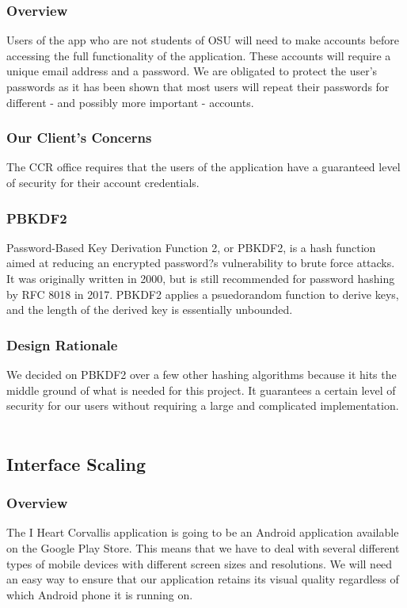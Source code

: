 \documentclass[draftclsnofoot, onecolumn, 10pt, compsoc]{IEEEtran}
\begin{document}
			\subsubsection{Overview}
				Users of the app who are not students of OSU will need to make accounts before accessing the full functionality of the application. These accounts will require a unique email address and a password. We are obligated to protect the user's passwords as it has been shown that most users will repeat their passwords for different - and possibly more important - accounts.
			\subsubsection{Our Client's Concerns}
				The CCR office requires that the users of the application have a guaranteed level of security for their account credentials.
			\subsubsection{PBKDF2}
				Password-Based Key Derivation Function 2, or PBKDF2, is a hash function aimed at reducing an encrypted password?s vulnerability to brute force attacks. It was originally written in 2000, but is still recommended for password hashing by RFC 8018 in 2017. PBKDF2 applies a psuedorandom function to derive keys, and the length of the derived key is essentially unbounded.
				~\cite{PBKDF2}
				~\cite{PBKDF2_More}
			\subsubsection{Design Rationale}
				We decided on PBKDF2 over a few other hashing algorithms because it hits the middle ground of what is needed for this project. It guarantees a certain level of security for our users without requiring a large and complicated implementation. 
				~\cite{PBKDF2}
				
		\subsection{Interface Scaling}
			\subsubsection{Overview}
				The I Heart Corvallis application is going to be an Android application available on the Google Play Store. This means that we have to deal with several different types of mobile devices with different screen sizes and resolutions. We will need an easy way to ensure that our application retains its visual quality regardless of which Android phone it is running on.
\end{document}
